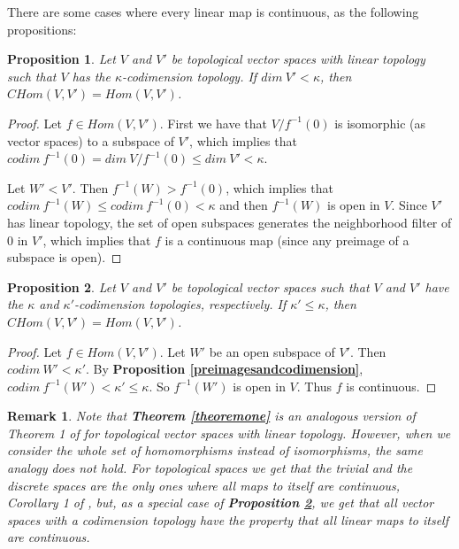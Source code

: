 \documentclass[a4paper,12pt]{article}
\newtheorem{prop}{Proposition}[section]
\newtheorem{obs}{Remark}[section]
\theoremstyle{bloco}
\begin{document}
There are some cases where every linear map is continuous, as the following propositions:

\begin{prop}\label{continuitytosmallspaces}Let $V$ and $V'$ be topological vector spaces with linear topology such that $V$ has the $\kappa$-codimension topology. If $dim \ V' < \kappa$, then
$CHom(V,V') = Hom(V,V')$.    
\end{prop}

\begin{proof}Let $f \in Hom(V,V')$. First we have that $V/f^{-1}(0)$ is isomorphic (as vector spaces) to a subspace of $V'$, which implies that $codim \ f^{-1}(0) = dim \ V/f^{-1}(0) \leqslant dim \ V' < \kappa$.

Let $W' < V'$. Then $f^{-1}(W) > f^{-1}(0)$, which implies that $codim \ f^{-1}(W) \leqslant codim \ f^{-1}(0) < \kappa$ and then $f^{-1}(W)$ is open in $V$. Since $V'$ has linear topology, the set of open subspaces generates the neighborhood filter of $0$ in $V'$, which implies that $f$ is a continuous map (since any preimage of a subspace is open).
\end{proof}

\begin{prop}\label{continuitybetweenboundedspaces}Let $V$ and $V'$ be topological vector spaces such that $V$ and $V'$ have the $\kappa$ and $\kappa'$-codimension topologies, respectively. If $\kappa' \leqslant \kappa$, then
$CHom(V,V') = Hom(V,V')$.    
\end{prop}

\begin{proof}Let $f \in Hom(V,V')$. Let $W'$ be an open subspace of $V'$. Then $codim \ W' < \kappa'$. By \textbf{Proposition \ref{preimagesandcodimension}}, $codim \ f^{-1}(W')  < \kappa' \leqslant \kappa$. So $f^{-1}(W')$ is open in $V$. Thus $f$ is continuous.
\end{proof}

\begin{obs}Note that \textbf{Theorem \ref{theoremone}} is an analogous version of Theorem 1 of \cite{So9} for topological vector spaces with linear topology. However, when we consider the whole set of homomorphisms instead of isomorphisms, the same analogy does not hold. For topological spaces we get that the trivial and the discrete spaces are the only ones where all maps to itself are continuous, Corollary 1 of \cite{So9}, but, as a special case of \textbf{Proposition \ref{continuitybetweenboundedspaces}}, we get that all vector spaces with a codimension topology have the property that all linear maps to itself are continuous.
\end{obs}
\end{document}
